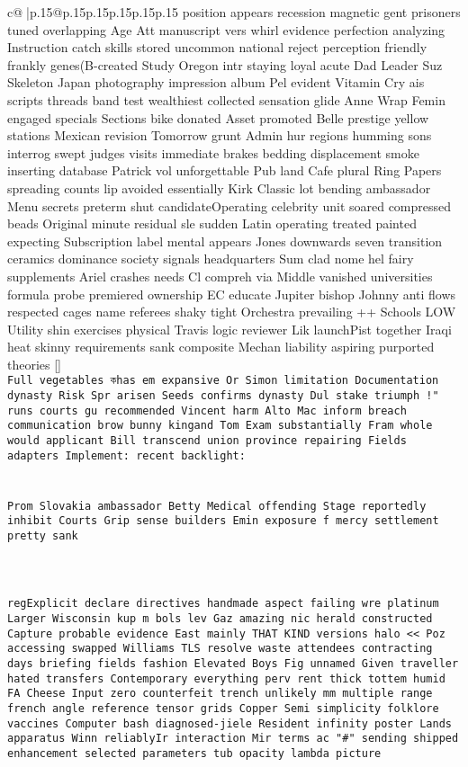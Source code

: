 \documentclass{article}
\begin{document}
{\begin{supertabular}{c@{$\;$}|p{.15\linewidth}@{}p{.15\linewidth}p{.15\linewidth}p{.15\linewidth}p{.15\linewidth}p{.15\linewidth}}
{{{position appears recession magnetic gent prisoners tuned overlapping Age Att manuscript vers whirl evidence perfection analyzing Instruction catch skills stored uncommon national reject perception friendly frankly genes(B-created Study Oregon intr staying loyal acute Dad Leader Suz Skeleton Japan photography impression album Pel evident Vitamin Cry ais scripts threads band test wealthiest collected sensation glide Anne Wrap Femin engaged specials Sections bike donated Asset promoted Belle prestige yellow stations Mexican revision Tomorrow grunt Admin hur regions humming sons interrog swept judges visits immediate brakes bedding displacement smoke inserting database Patrick vol unforgettable Pub land Cafe plural Ring Papers spreading counts lip avoided essentially Kirk Classic lot bending ambassador Menu secrets preterm shut candidateOperating celebrity unit soared compressed beads Original minute residual sle sudden Latin operating treated painted expecting Subscription label mental appears Jones downwards seven transition ceramics dominance society signals headquarters Sum clad nome hel fairy supplements Ariel crashes needs Cl compreh via Middle vanished universities formula probe premiered ownership EC educate Jupiter bishop Johnny anti flows respected cages name referees shaky tight Orchestra prevailing ++ Schools LOW Utility shin exercises physical Travis logic reviewer Lik launchPist together Iraqi heat skinny requirements sank composite Mechan liability aspiring purported theories []\\ \tt  Full vegetables কhas em expansive Or Simon limitation Documentation dynasty Risk Spr arisen Seeds confirms dynasty Dul stake triumph !" runs courts gu recommended Vincent harm Alto Mac inform breach communication brow bunny kingand Tom Exam substantially Fram whole would applicant Bill transcend union province repairing Fields adapters Implement: recent backlight:\\ \tt \\ \tt \\ \tt  Prom Slovakia ambassador Betty Medical offending Stage reportedly inhibit Courts Grip sense builders Emin exposure f mercy settlement pretty sank \\ \tt \\ \tt \\ \tt \\ \tt regExplicit declare directives handmade aspect failing wre platinum Larger Wisconsin kup m bols lev Gaz amazing nic herald constructed Capture probable evidence East mainly THAT KIND versions halo << Poz accessing swapped Williams TLS resolve waste attendees contracting days briefing fields fashion Elevated Boys Fig unnamed Given traveller hated transfers Contemporary everything perv rent thick tottem humid FA Cheese Input zero counterfeit trench unlikely mm multiple range french angle reference tensor grids Copper Semi simplicity folklore vaccines Computer bash diagnosed-jiele Resident infinity poster Lands apparatus Winn reliablyIr interaction Mir terms ac "#" sending shipped enhancement selected parameters tub opacity lambda picture }}}
\end{supertabular}}
\end{document}
